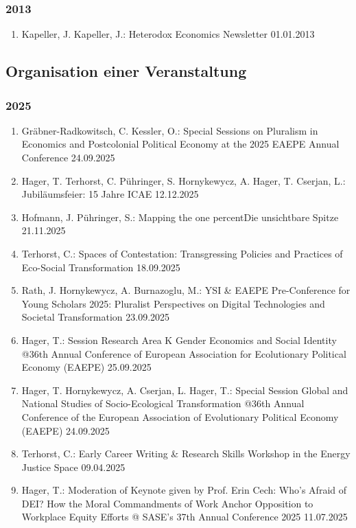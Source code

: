 \subsubsection*{2013}
\begin{enumerate}
	\item Kapeller, J. Kapeller, J.: Heterodox Economics Newsletter 01.01.2013
\end{enumerate}


\subsection{Organisation einer Veranstaltung}
\subsubsection*{2025}
\begin{enumerate}
	\item Gräbner-Radkowitsch, C. Kessler, O.: Special Sessions on \glqq Pluralism in Economics and Postcolonial Political Economy\grqq{} at the 2025 EAEPE Annual Conference 24.09.2025
	\item Hager, T. Terhorst, C. Pühringer, S. Hornykewycz, A. Hager, T. Cserjan, L.: Jubiläumsfeier: 15 Jahre ICAE 12.12.2025
	\item Hofmann, J. Pühringer, S.: Mapping the one percentDie unsichtbare Spitze 21.11.2025
	\item Terhorst, C.: Spaces of Contestation: Transgressing Policies and Practices of Eco-Social Transformation 18.09.2025
	\item Rath, J. Hornykewycz, A. Burnazoglu, M.: YSI \& EAEPE Pre-Conference for Young Scholars 2025: Pluralist Perspectives on Digital Technologies and Societal Transformation 23.09.2025
	\item Hager, T.: Session Research Area K \glqq Gender Economics and Social Identity\grqq{} @36th Annual Conference of European Association for Ecolutionary Political Economy (EAEPE) 25.09.2025
	\item Hager, T. Hornykewycz, A. Cserjan, L. Hager, T.: Special Session \glqq Global and National Studies of Socio-Ecological Transformation\grqq{} @36th Annual Conference of the European Association of Evolutionary Political Economy (EAEPE) 24.09.2025
	\item Terhorst, C.: Early Career Writing \& Research Skills Workshop in the Energy Justice Space 09.04.2025
	\item Hager, T.: Moderation of Keynote given by Prof. Erin Cech: \glqq Who’s Afraid of DEI? How the Moral Commandments of Work Anchor Opposition to Workplace Equity Efforts\grqq{} @ SASE's 37th Annual Conference 2025 11.07.2025

\end{enumerate}
